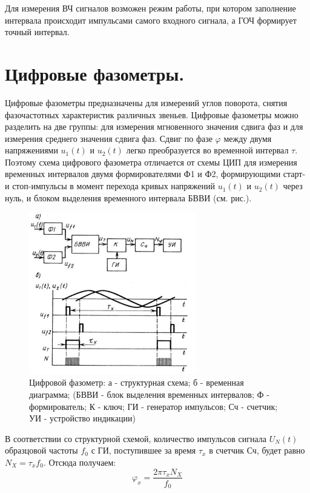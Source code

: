 \documentclass[unicode, 12pt, a4paper, oneside]{article}
\begin{document}
Для измерения ВЧ сигналов возможен режим работы, при котором заполнение интервала происходит импульсами самого входного сигнала, а ГОЧ формирует точный интервал.

\section{Цифровые фазометры.}

Цифровые фазометры предназначены для измерений углов поворота, снятия фазочастотных характеристик различных звеньев. Цифровые фазометры можно разделить на две группы: для измерения мгновенного значения сдвига фаз и для измерения среднего значения сдвига фаз. Сдвиг по фазе $\varphi$ между двумя напряжениями $u_1 (t)$ и $u_2 (t)$ легко преобразуется во временной интервал $\tau$.
Поэтому схема цифрового фазометра отличается от схемы ЦИП для измерения временных интервалов двумя формирователями Ф1 и Ф2, формирующими старт- и стоп-импульсы в момент перехода кривых напряжений $u_1 (t)$ и $u_2 (t)$ через нуль, и блоком выделения временного интервала БВВИ (см. рис.).

\begin{figure}[H]
\centering
\includegraphics[width=0.65\textwidth]{54.jpg}
\caption{Цифровой фазометр: а - структурная схема; б - временная диаграмма; (БВВИ - блок выделения временных интервалов; Ф - формирователь; К - ключ; ГИ - генератор импульсов; Сч - счетчик; УИ - устройство индикации)}
\end{figure}

В соответствии со структурной схемой, количество импульсов сигнала $U_N (t)$ образцовой частоты $f_0$ с ГИ, поступившее за время $\tau_x$ в счетчик Сч, будет равно $N_X = \tau_x f_0$. Отсюда получаем:
\begin{displaymath}
\varphi_x = \frac{2\pi \tau_x N_X}{f_0}
\end{displaymath}
\end{document}
